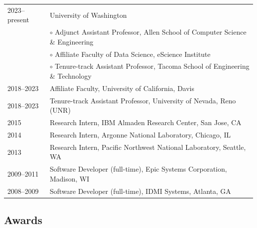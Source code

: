 \documentclass[11pt,]{scrartcl}
\newcommand{\arygap}{.9}
\begin{document}
\begin{table}[h]
{\def\arraystretch{\arygap}\tabcolsep=0pt
\begin{tabular}{p{0.17\linewidth}p{0.83\linewidth}}

2023--present & University of Washington\\ 
    & \quad $\circ$ Adjunct Assistant Professor, Allen School of Computer Science \& Engineering\\    
    & \quad $\circ$ Affiliate Faculty of Data Science, eScience Institute\\    & \quad $\circ$ Tenure-track Assistant Professor, Tacoma School of Engineering \& Technology\\


2018--2023 & Affiliate Faculty, University of California, Davis \\
2018--2023 & Tenure-track Assistant Professor, University of Nevada, Reno (UNR) \\ 


  2015 & Research Intern, IBM Almaden Research Center, San Jose, CA \\
  2014 & Research Intern, Argonne National Laboratory, Chicago, IL \\
  2013 & Research Intern, Pacific Northwest National Laboratory, Seattle, WA\\
   2009--2011 & Software Developer (full-time), Epic Systems Corporation, Madison, WI\\
   2008--2009 & Software Developer (full-time), IDMI Systems, Atlanta, GA\\   
  
\end{tabular}%
}
\end{table}

\subsection{Awards}
\end{document}
